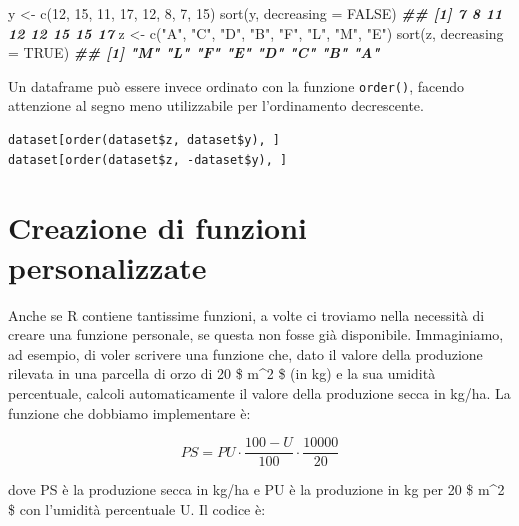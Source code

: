 \documentclass[
  12pt,
]{book}
\newenvironment{Shaded}{\begin{snugshade}}{\end{snugshade}}
\newcommand{\AttributeTok}[1]{\textcolor[rgb]{0.77,0.63,0.00}{#1}}
\newcommand{\ConstantTok}[1]{\textcolor[rgb]{0.00,0.00,0.00}{#1}}
\newcommand{\DecValTok}[1]{\textcolor[rgb]{0.00,0.00,0.81}{#1}}
\newcommand{\DocumentationTok}[1]{\textcolor[rgb]{0.56,0.35,0.01}{\textbf{\textit{#1}}}}
\newcommand{\FunctionTok}[1]{\textcolor[rgb]{0.00,0.00,0.00}{#1}}
\newcommand{\NormalTok}[1]{#1}
\newcommand{\OtherTok}[1]{\textcolor[rgb]{0.56,0.35,0.01}{#1}}
\newcommand{\StringTok}[1]{\textcolor[rgb]{0.31,0.60,0.02}{#1}}
\begin{document}
\begin{Shaded}
\begin{Highlighting}[]
\NormalTok{y  }\OtherTok{\textless{}{-}}  \FunctionTok{c}\NormalTok{(}\DecValTok{12}\NormalTok{, }\DecValTok{15}\NormalTok{, }\DecValTok{11}\NormalTok{, }\DecValTok{17}\NormalTok{, }\DecValTok{12}\NormalTok{, }\DecValTok{8}\NormalTok{, }\DecValTok{7}\NormalTok{, }\DecValTok{15}\NormalTok{)}
\FunctionTok{sort}\NormalTok{(y, }\AttributeTok{decreasing =} \ConstantTok{FALSE}\NormalTok{)}
\DocumentationTok{\#\# [1]  7  8 11 12 12 15 15 17}
\NormalTok{z  }\OtherTok{\textless{}{-}}  \FunctionTok{c}\NormalTok{(}\StringTok{"A"}\NormalTok{, }\StringTok{"C"}\NormalTok{, }\StringTok{"D"}\NormalTok{, }\StringTok{"B"}\NormalTok{, }\StringTok{"F"}\NormalTok{, }\StringTok{"L"}\NormalTok{, }\StringTok{"M"}\NormalTok{, }\StringTok{"E"}\NormalTok{)}
\FunctionTok{sort}\NormalTok{(z, }\AttributeTok{decreasing =} \ConstantTok{TRUE}\NormalTok{)}
\DocumentationTok{\#\# [1] "M" "L" "F" "E" "D" "C" "B" "A"}
\end{Highlighting}
\end{Shaded}

Un dataframe può essere invece ordinato con la funzione \texttt{order()}, facendo attenzione al segno meno utilizzabile per l'ordinamento decrescente.

\begin{verbatim}
dataset[order(dataset$z, dataset$y), ]
dataset[order(dataset$z, -dataset$y), ]
\end{verbatim}

\hypertarget{creazione-di-funzioni-personalizzate}{%
\section{Creazione di funzioni personalizzate}\label{creazione-di-funzioni-personalizzate}}

Anche se R contiene tantissime funzioni, a volte ci troviamo nella necessità di creare una funzione personale, se questa non fosse già disponibile. Immaginiamo, ad esempio, di voler scrivere una funzione che, dato il valore della produzione rilevata in una parcella di orzo di 20 \$ m\^{}2 \$ (in kg) e la sua umidità percentuale, calcoli automaticamente il valore della produzione secca in kg/ha. La funzione che dobbiamo implementare è:

\[ PS = PU \cdot \frac{100 - U}{100} \cdot \frac{10000}{20}\]

dove PS è la produzione secca in kg/ha e PU è la produzione in kg per 20 \$ m\^{}2 \$ con l'umidità percentuale U. Il codice è:
\end{document}
